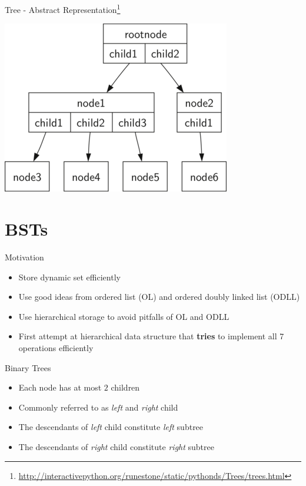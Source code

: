 \documentclass{beamer}
\begin{document}
\begin{frame}{Tree - Abstract Representation\footnote{\url{http://interactivepython.org/runestone/static/pythonds/Trees/trees.html}}}
\begin{center}
    \includegraphics[scale=0.7]{treedef1.png}
\end{center}
\end{frame}


\section{BSTs}

\begin{frame}{Motivation}
    \begin{itemize}
        \item Store dynamic set efficiently
        \item Use good ideas from ordered list (OL) and ordered doubly linked list (ODLL)
        \item Use hierarchical storage to avoid pitfalls of OL and ODLL
        \item First attempt at hierarchical data structure that {\bf tries} to implement all 7 operations efficiently
    \end{itemize}
\end{frame}

\begin{frame}{Binary Trees}
    \begin{itemize}
        \item Each node has at most $2$ children
        \item Commonly referred to as {\em left} and {\em right} child
        \item The descendants of {\em left} child constitute {\em left} subtree
        \item The descendants of {\em right} child constitute {\em right} subtree
    \end{itemize}
\end{frame}
\end{document}
